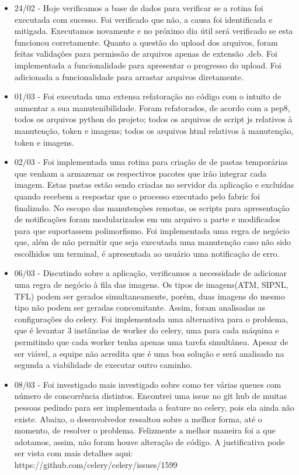 \begin{itemize}
    \item 24/02 -
  Hoje verificamos a base de dados para verificar se a rotina foi executada com sucesso. Foi verificado que não, a causa foi identificada e mitigada. Executamos novamente e no próximo dia útil será verificado se esta funcionou corretamente.
  Quanto a questão do upload dos arquivos, foram feitas validações para permissão de arquivos apenas de extensão .deb. Foi implementada a funcionalidade para apresentar o progresso do upload. Foi adicionada a funcionalidade para arrastar arquivos diretamente.


    \item 01/03 -
  Foi executada uma extensa refatoração no código com o intuito de aumentar a sua manutenibilidade. Foram refatorados, de acordo com a pep8, todos os arquivos python do projeto; todos os arquivos de script js relativos à manutenção, token e imagens; todos os arquivos html relativos à manutenção, token e imagens.


    \item 02/03 -
  Foi implementada uma rotina para criação de de pastas temporárias que venham a armazenar os respectivos pacotes que irão integrar cada imagem. Estas pastas estão sendo criadas no servidor da aplicação e excluídas quando recebem a respostar que o processo executado pelo fabric foi finalizado.
  No escopo das manutenções remotas, os scripts para apresentação de notificações foram modularizados em um arquivo a parte e modificados para que suportassem polimorfismo.
  Foi implementada uma regra de negócio que, além de não permitir que seja executada uma manutenção caso não sido escolhidos um terminal, é apresentada ao usuário uma notificação de erro.


    \item 06/03 -
  Discutindo sobre a aplicação, verificamos a necessidade de adicionar uma regra de negócio à fila das imagens. Os tipos de imagens(ATM, SIPNL, TFL) podem ser gerados simultaneamente, porém, duas imagens do mesmo tipo não podem ser geradas concomitante. Assim, foram analisadas as configurações do celery. Foi implementada uma alternativa para o problema, que é levantar 3 instâncias de worker do celery, uma para cada máquina e permitindo que cada worker tenha apenas uma tarefa simultânea. Apesar de ser viável, a equipe não acredita que é uma boa solução e será analisado na segunda a viabilidade de executar outro caminho.


    \item 08/03 -
  Foi investigado mais investigado sobre como ter várias queues com número de concorrência distintos. Encontrei uma issue no git hub de muitas pessoas pedindo para ser implementada a feature no celery, pois ela ainda não existe. Abaixo, o desenvolvedor ressaltou sobre a melhor forma, até o momento, de resolver o problema. Felizmente a melhor maneira foi a que adotamos, assim, não foram houve alteração de código. A justificativa pode ser vista com mais detalhes aqui: https://github.com/celery/celery/issues/1599


\end{itemize}
